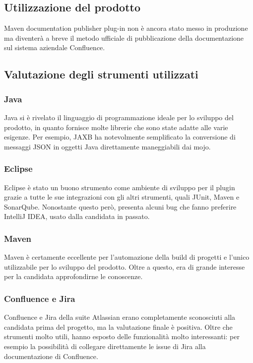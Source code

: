 \subsection{Utilizzazione del prodotto} %
Maven documentation publisher plug-in non è ancora stato messo in produzione ma diventerà a breve il metodo ufficiale di pubblicazione della documentazione sul sistema aziendale Confluence.


\subsection{Valutazione degli strumenti utilizzati}

    \subsubsection{Java}
    Java si è rivelato il linguaggio di programmazione ideale per lo sviluppo del prodotto, in quanto fornisce molte librerie che sono state adatte alle varie esigenze.
    Per esempio, JAXB ha notevolmente semplificato la conversione di messaggi JSON in oggetti Java direttamente maneggiabili dai mojo.

    \subsubsection{Eclipse}
    Eclipse è stato un buono strumento come ambiente di sviluppo per il plugin grazie a tutte le sue integrazioni con gli altri strumenti, quali JUnit, Maven e SonarQube.
    Nonostante questo però, presenta alcuni bug che fanno preferire IntelliJ IDEA, usato dalla candidata in passato.

    \subsubsection{Maven}
    Maven è certamente eccellente per l'automazione della build di progetti e l'unico utilizzabile per lo sviluppo del prodotto.
    Oltre a questo, era di grande interesse per la candidata approfondirne le conoscenze.

    \subsubsection{Confluence e Jira}
    Confluence e Jira della suite Atlassian erano completamente sconosciuti alla candidata prima del progetto, ma la valutazione finale è positiva.
    Oltre che strumenti molto utili, hanno esposto delle funzionalità molto interessanti: per esempio la possibilità di collegare direttamente le issue di Jira alla documentazione di Confluence.


